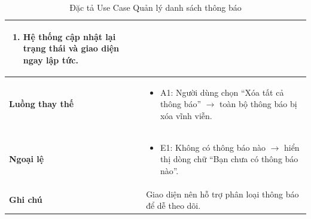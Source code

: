 \begin{table}[H]
\begin{tabularx}{\textwidth}{|l|X|}
\begin{enumerate}
    \item Hệ thống cập nhật lại trạng thái và giao diện ngay lập tức.
\end{enumerate} \\ \hline
\textbf{Luồng thay thế} & 
\begin{itemize}
    \item A1: Người dùng chọn ``Xóa tất cả thông báo'' $\rightarrow$ toàn bộ thông báo bị xóa vĩnh viễn.
\end{itemize} \\ \hline
\textbf{Ngoại lệ} & 
\begin{itemize}
    \item E1: Không có thông báo nào $\rightarrow$ hiển thị dòng chữ ``Bạn chưa có thông báo nào''.
\end{itemize} \\ \hline
\textbf{Ghi chú} & Giao diện nên hỗ trợ phân loại thông báo để dễ theo dõi. \\ \hline
\end{tabularx}
\caption{Đặc tả Use Case Quản lý danh sách thông báo}
\end{table}

